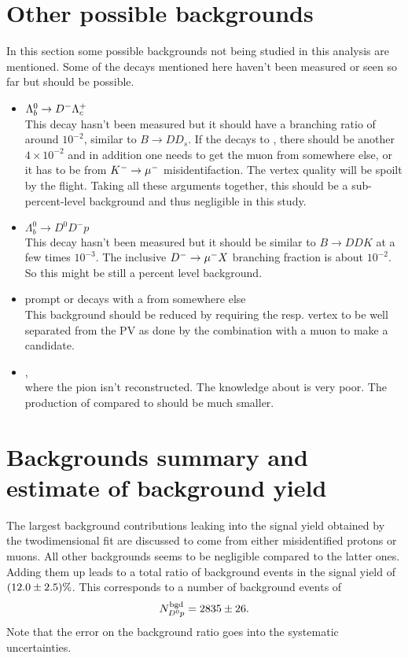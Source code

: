 \section{Other possible backgrounds}
In this section some possible backgrounds not being studied in this analysis are mentioned.
Some of the decays mentioned here haven't been measured or seen so far but should be possible.
\begin{itemize}
    \item $\Lambda_b^0 \rightarrow {\ensuremath{{D}^-}} {\ensuremath{{\Lambda}^+_{c}}}$ \\
          This decay hasn't been measured but it should have a branching ratio of around $10^{-2}$, similar to $B \rightarrow D D_s$.
          If the \Lc decays to \pKpi, there should be another $4 \times 10^{-2}$ and in addition one needs to get the muon from somewhere else, or it has to be from ${{K}^-} \rightarrow {\ensuremath{\mu^-}}$ misidentifaction. 
          The vertex quality will be spoilt by the \Lc flight.
          Taking all these arguments together, this should be a sub-percent-level background and thus negligible in this study.
    \item $\Lambda_b^0 \rightarrow D^0 D^- p$ \\
          This decay hasn't been measured but it should be similar to $B \rightarrow DDK$ at a few times $10^{-3}$.
          The inclusive ${{D}^-} \rightarrow {\ensuremath{\mu^-}} X$ branching fraction is about $10^{-2}$.
          So this might be still a percent level background.
    \item prompt \LcResI or \LcResII decays with a \mun from somewhere else \\
          This background should be reduced by requiring the \LcResI resp. \LcResII vertex to be well separated from the PV as done by the combination with a muon to make a \Lb candidate.
    \item \decay{\SigmabRes}{\Lb \pi}, \\ 
          where the pion isn't reconstructed.
          The knowledge about \SigmabRes is very poor.
          The production of \SigmabRes compared to \Lb should be much smaller.
\end{itemize}

\section{Backgrounds summary and estimate of background yield}
The largest background contributions leaking into the signal yield \NDp obtained by the twodimensional fit are discussed to come from either misidentified protons or muons.
All other backgrounds seems to be negligible compared to the latter ones.
Adding them up leads to a total ratio of background events in the signal yield of $(12.0 \pm 2.5)\%$.
This corresponds to a number of background events of 
\begin{align*}
    N^{\rm bgd}_{{{D}^0}{p}} = 2835 \pm 26.
\end{align*}
Note that the error on the background ratio goes into the systematic uncertainties.
